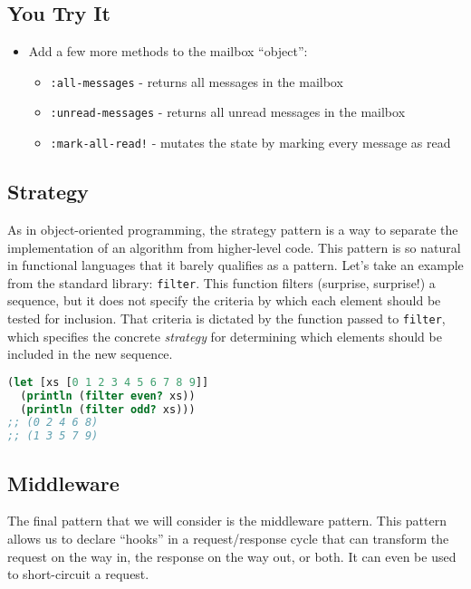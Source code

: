 \documentclass[10pt,twoside,openright]{memoir}
\begin{document}
\subsection{You Try It}

\begin{itemize}
\tightlist
\item
  Add a few more methods to the mailbox ``object'':

  \begin{itemize}
  \tightlist
  \item
    \texttt{:all-messages} - returns all messages in the mailbox
  \item
    \texttt{:unread-messages} - returns all unread messages in the
    mailbox
  \item
    \texttt{:mark-all-read!} - mutates the state by marking every
    message as read
  \end{itemize}
\end{itemize}


\subsection{Strategy}

As in object-oriented programming, the strategy pattern is a way to
separate the implementation of an algorithm from higher-level code. This
pattern is so natural in functional languages that it barely qualifies
as a pattern. Let's take an example from the standard library:
\texttt{filter}. This function filters (surprise, surprise!) a sequence,
but it does not specify the criteria by which each element should be
tested for inclusion. That criteria is dictated by the function passed
to \texttt{filter}, which specifies the concrete \emph{strategy} for
determining which elements should be included in the new sequence.

\begin{lstlisting}[language=Clojure]
(let [xs [0 1 2 3 4 5 6 7 8 9]]
  (println (filter even? xs))
  (println (filter odd? xs)))
;; (0 2 4 6 8)
;; (1 3 5 7 9)
\end{lstlisting}

\subsection{Middleware}

The final pattern that we will consider is the middleware pattern. This
pattern allows us to declare ``hooks'' in a request/response cycle that
can transform the request on the way in, the response on the way out, or
both. It can even be used to short-circuit a request.
\end{document}
